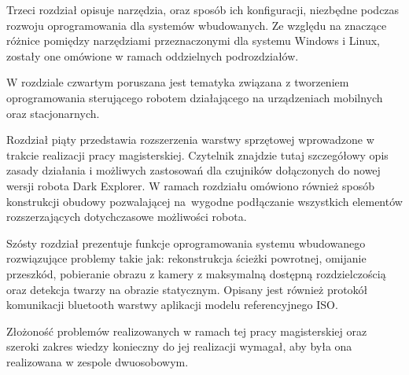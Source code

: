 Trzeci rozdział opisuje narzędzia, oraz sposób ich konfiguracji, niezbędne
podczas rozwoju oprogramowania dla systemów wbudowanych. Ze względu na znaczące
różnice pomiędzy narzędziami przeznaczonymi dla systemu Windows i Linux, zostały
one omówione w ramach oddzielnych podrozdziałów.

W rozdziale czwartym poruszana jest tematyka związana z tworzeniem oprogramowania
sterującego robotem działającego na urządzeniach mobilnych oraz stacjonarnych.

Rozdział piąty przedstawia rozszerzenia warstwy sprzętowej wprowadzone w trakcie
realizacji pracy magisterskiej. Czytelnik znajdzie tutaj szczegółowy opis zasady
działania i możliwych zastosowań dla czujników dołączonych do nowej wersji robota
Dark Explorer. W ramach rozdziału omówiono również sposób konstrukcji obudowy
pozwalającej na~wygodne podłączanie wszystkich elementów rozszerzających
dotychczasowe możliwości robota.

Szósty rozdział prezentuje funkcje oprogramowania systemu wbudowanego
rozwiązujące problemy takie jak: rekonstrukcja ścieżki powrotnej, omijanie
przeszkód, pobieranie obrazu z kamery z maksymalną dostępną rozdzielczością oraz
detekcja twarzy na obrazie statycznym. Opisany jest również protokół komunikacji
bluetooth warstwy aplikacji modelu referencyjnego ISO.

Złożoność problemów realizowanych w ramach tej pracy magisterskiej oraz szeroki
zakres wiedzy konieczny do jej realizacji wymagał, aby była ona realizowana w
zespole dwuosobowym.